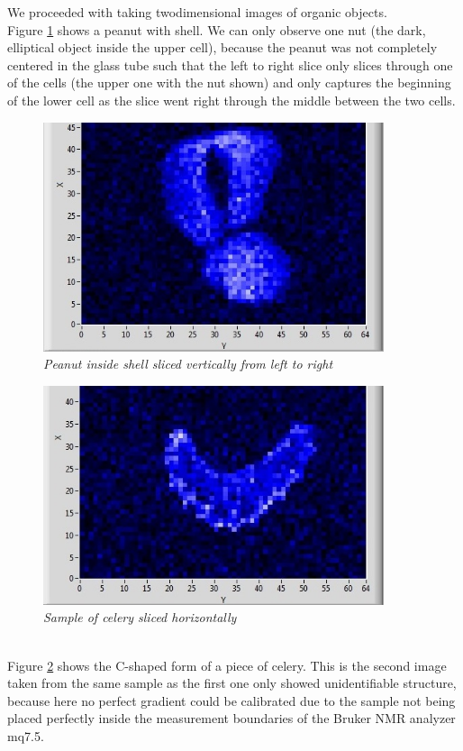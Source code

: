 \noindent
We proceeded with taking twodimensional images of organic objects.\\
Figure \ref{fig:16} shows a peanut with shell. We can only observe one nut (the dark, elliptical object inside the upper cell), because the peanut was not completely centered in the glass tube such that the left to right slice only slices through one of the cells (the upper one with the nut shown) and only captures the beginning of the lower cell as the slice went right through the middle between the two cells.
\begin{figure}[h]
	\includegraphics[width=100mm]{Peanut}
	\centering
	\caption{\itshape Peanut inside shell sliced vertically from left to right}
	\label{fig:16}
\end{figure}
\begin{figure}[h]
	\includegraphics[width=100mm]{Celery}
	\centering
	\caption{\itshape Sample of celery sliced horizontally}
	\label{fig:17}
\end{figure}
\noindent
\\
Figure \ref{fig:17} shows the C-shaped form of a piece of celery. This is the second image taken from the same sample as the first one only showed unidentifiable structure, because here no perfect gradient could be calibrated due to the sample not being placed perfectly inside the measurement boundaries of the Bruker NMR analyzer mq7.5. 

